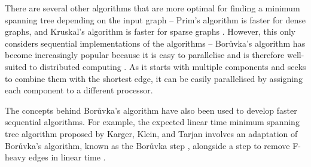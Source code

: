 \documentclass[a4paper, 11pt]{article}
\begin{document}

There are several other algorithms that are more optimal for finding a minimum spanning tree depending on the input graph -- Prim's algorithm is faster for dense graphs, and Kruskal's algorithm is faster for sparse graphs \cite{bazlamaccci2001minimum}. However, this only considers sequential implementations of the algorithms -- Borůvka's algorithm has become increasingly popular because it is easy to parallelise and is therefore well-suited to distributed computing \cite{mariano2015generic}. As it starts with multiple components and seeks to combine them with the shortest edge, it can be easily parallelised by assigning each component to a different processor.

The concepts behind Borůvka's algorithm have also been used to develop faster sequential algorithms. For example, the expected linear time minimum spanning tree algorithm proposed by Karger, Klein, and Tarjan involves an adaptation of Borůvka's algorithm, known as the Borůvka step \cite{dixon1992verification, king1995simpler}, alongside a step to remove F-heavy edges in linear time \cite{karger1995randomized}.

\newpage


\end{document}
